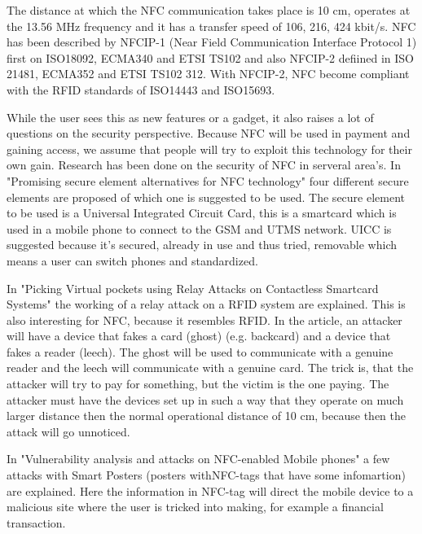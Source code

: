 
The distance at which the NFC communication takes place is 10 cm, operates at the 13.56 MHz frequency and it has a transfer speed of 106, 216, 424 kbit/s. NFC has been described by NFCIP-1 (Near Field Communication Interface Protocol 1) first on ISO18092, ECMA340 and ETSI TS102 and also NFCIP-2 defiined in ISO 21481, ECMA352 and ETSI TS102 312. With NFCIP-2, NFC become compliant with the RFID standards of ISO14443 and ISO15693.
 
While the user sees this as new features or a gadget, it also raises a lot of questions on the security perspective. Because NFC will be used in payment and gaining access, we assume that people will try to exploit this technology for their own gain. 
Research has been done on the security of NFC in serveral area's. In "Promising secure element alternatives for NFC technology" four different secure elements are proposed of which one is suggested to be used. The secure element to be used is a Universal Integrated Circuit Card, this is a smartcard which is used in a mobile phone to connect to the GSM and UTMS network. UICC is suggested because it's secured, already in use and thus tried, removable which means a user can switch phones and standardized. 

In "Picking Virtual pockets using Relay Attacks on Contactless Smartcard Systems" the working of a relay attack on  a RFID system are explained. This is also interesting for NFC, because it resembles RFID. In the article,  an attacker will have a device that fakes a card (ghost) (e.g. backcard) and a device that fakes a reader (leech). The ghost will be used to communicate with a genuine reader and the leech will communicate with a genuine card. The trick is, that the attacker will try to pay for something, but the victim is the one paying. The attacker must have the devices set up in such a way that they operate on much larger distance then the normal operational distance of 10 cm, because then the attack will go unnoticed.


In "Vulnerability analysis and attacks on NFC-enabled Mobile phones" a few attacks with Smart Posters (posters withNFC-tags that have some infomartion) are explained. Here the information in NFC-tag will direct the mobile device to a malicious site where the user is tricked into making, for example a financial transaction.

